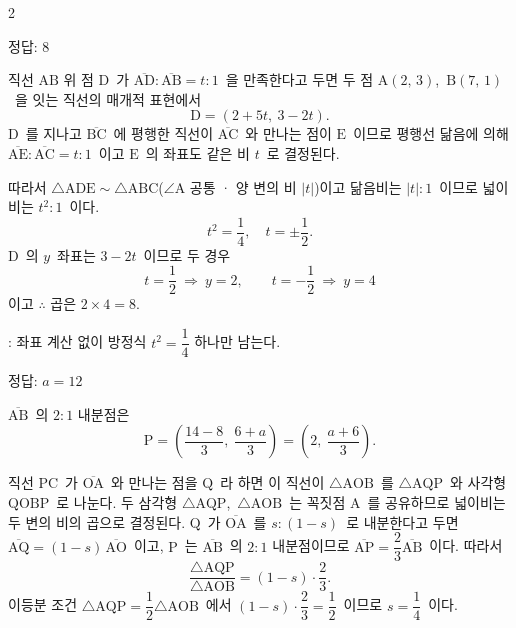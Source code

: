 \documentclass[10pt,fleqn]{article}   %
\begin{document}
\dmsoltitlefirsttrue
\begin{multicols*}{2}

\begin{dmanswerbox}
정답: $8$
\end{dmanswerbox}

직선 $\mathrm{AB}$ 위 점 $\mathrm{D}$\ 가 $\overline{\mathrm{AD}}:\overline{\mathrm{AB}}=t:1$\ 을 만족한다고 두면 두 점 $\mathrm{A}(2,\,3)$,\ $\mathrm{B}(7,\,1)$\ 을 잇는 직선의 매개적 표현에서
\[ \mathrm{D} = (2 + 5t,\ 3 - 2t). \]
$\mathrm{D}$\ 를 지나고 $\overline{\mathrm{BC}}$\ 에 평행한 직선이 $\overline{\mathrm{AC}}$\ 와 만나는 점이 $\mathrm{E}$\ 이므로 평행선 닮음에 의해 $\overline{\mathrm{AE}}:\overline{\mathrm{AC}}=t:1$\ 이고 $\mathrm{E}$\ 의 좌표도 같은 비 $t$\ 로 결정된다.

따라서 $\triangle\mathrm{ADE}\sim\triangle\mathrm{ABC}$($\angle\mathrm{A}$ 공통 · 양 변의 비 $|t|$)이고 닮음비는 $|t|:1$\ 이므로 넓이비는 $t^2:1$\ 이다.
\[ t^2 = \dfrac{1}{4},\quad t = \pm \dfrac{1}{2}. \]
$\mathrm{D}$\ 의 $y$\ 좌표는 $3-2t$\ 이므로 두 경우
$$t = \dfrac{1}{2}\ \Rightarrow\ y = 2,\qquad t = -\dfrac{1}{2}\ \Rightarrow\ y = 4$$
이고 $\therefore$ 곱은 $2\times 4 = 8$.

\begin{dmcriticalpoint}
: 좌표 계산 없이 방정식 $t^2=\dfrac{1}{4}$ 하나만 남는다.
\end{dmcriticalpoint}

\begin{dmanswerbox}
정답: $a=12$
\end{dmanswerbox}

$\overline{\mathrm{AB}}$\ 의 $2:1$ 내분점은
\[ \mathrm{P} = \left( \dfrac{14-8}{3},\ \dfrac{6+a}{3} \right) = \left( 2,\ \dfrac{a+6}{3} \right). \]

직선 $\mathrm{PC}$\ 가 $\overline{\mathrm{OA}}$\ 와 만나는 점을 $\mathrm{Q}$\ 라 하면 이 직선이 $\triangle\mathrm{AOB}$\ 를 $\triangle\mathrm{AQP}$\ 와 사각형 $\mathrm{QOBP}$\ 로 나눈다. 두 삼각형 $\triangle\mathrm{AQP}$,\ $\triangle\mathrm{AOB}$\ 는 꼭짓점 $\mathrm{A}$\ 를 공유하므로 넓이비는 두 변의 비의 곱으로 결정된다. $\mathrm{Q}$\ 가 $\overline{\mathrm{OA}}$\ 를 $s : (1-s)$\ 로 내분한다고 두면 $\overline{\mathrm{AQ}}=(1-s)\,\overline{\mathrm{AO}}$\ 이고, $\mathrm{P}$\ 는 $\overline{\mathrm{AB}}$\ 의 $2:1$ 내분점이므로 $\overline{\mathrm{AP}}=\dfrac{2}{3}\overline{\mathrm{AB}}$\ 이다. 따라서
\[ \dfrac{\triangle\mathrm{AQP}}{\triangle\mathrm{AOB}} = (1-s)\cdot\dfrac{2}{3}. \]
이등분 조건 $\triangle\mathrm{AQP}=\dfrac{1}{2}\triangle\mathrm{AOB}$\ 에서 $(1-s)\cdot\dfrac{2}{3}=\dfrac{1}{2}$\ 이므로 $s=\dfrac{1}{4}$\ 이다.


\end{multicols*}
\end{document}
